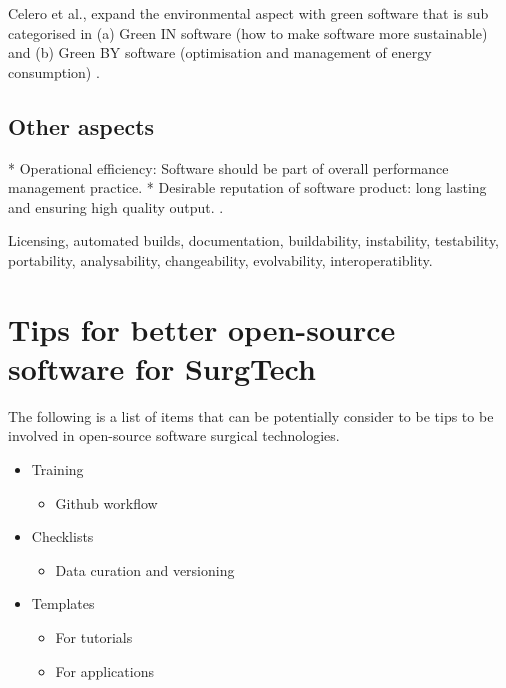 \documentclass{article}
\begin{document}
Celero et al., expand the environmental aspect with green software that is sub categorised in (a) Green IN software (how to make software more sustainable) and (b) Green BY software (optimisation and management of energy consumption) \cite{calero2019-software-sustainability}.



\subsection{Other aspects}
* Operational efficiency: Software should be part of overall performance management practice. 
* Desirable reputation of software product: long lasting and ensuring high quality output.
\cite{imran2019software}.

Licensing, automated builds, documentation, buildability, instability, testability, portability, analysability, changeability, evolvability, interoperatiblity. 






\section{Tips for better open-source software for SurgTech}
The following is a list of items that can be potentially consider to be tips to be involved in open-source software surgical technologies.
\begin{itemize}
\item Training 
    \begin{itemize}
    \item Github workflow
    \end{itemize}
\item Checklists
    \begin{itemize}
    \item Data curation and versioning
    \end{itemize}
\item Templates
    \begin{itemize}
    \item For tutorials
    \item For applications
    \end{itemize}
\end{itemize}
\end{document}
